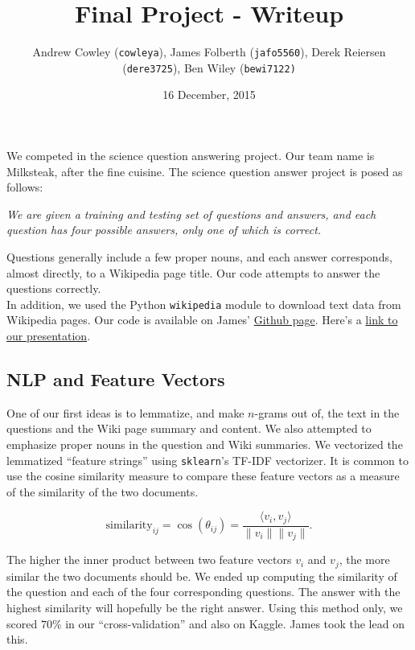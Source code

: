 \documentclass{article}
\title{Final Project - Writeup}
\date{\small 16 December, 2015}
\author{\normalsize Andrew Cowley (\texttt{cowleya}), James Folberth (\texttt{jafo5560}), Derek Reiersen (\texttt{dere3725}), Ben Wiley (\texttt{bewi7122)}}
\theoremstyle{mystuff}
\theoremstyle{myexample}
\theoremstyle{named}
\begin{document}
\maketitle

We competed in the science question answering project.  Our team name is Milksteak, after the fine cuisine. The science question answer project is posed as follows: 

\begin{center}
    \parbox{0.65\linewidth}{%
        \textit{We are given a training and testing set of questions and answers, and each question has four possible answers, only one of which is correct.}
    }
\end{center}

Questions generally include a few proper nouns, and each answer corresponds, almost directly, to a Wikipedia page title.  Our code attempts to answer the questions correctly. \\

In addition, we used the Python \texttt{wikipedia} module to download text data from Wikipedia pages.  Our code is available on James' \href{https://github.com/jamesfolberth/ml_project}{Github page}.  Here's a \href{https://www.youtube.com/watch?v=W-eg617wNO8}{link to our presentation}.\\

\subsection{NLP and Feature Vectors}
\label{ssec:nlp}
One of our first ideas is to lemmatize, and make $n$-grams out of, the text in the questions and the Wiki page summary and content.  We also attempted to emphasize proper nouns in the question and Wiki summaries.  We vectorized the lemmatized ``feature strings'' using \texttt{sklearn}'s TF-IDF vectorizer.  It is common to use the cosine similarity measure to compare these feature vectors as a measure of the similarity of the two documents.

\[ \text{similarity}_{ij} = \cos(\theta_{ij}) = \dfrac{\langle v_i, v_j\rangle}{\|v_i\|\|v_j\|}. \] 

\noindent The higher the inner product between two feature vectors $v_i$ and $v_j$, the more similar the two documents should be.  We ended up computing the similarity of the question and each of the four corresponding questions.  The answer with the highest similarity will hopefully be the right answer.  Using this method only, we scored $70\%$ in our ``cross-validation'' and also on Kaggle.  James took the lead on this.\\
\end{document}
